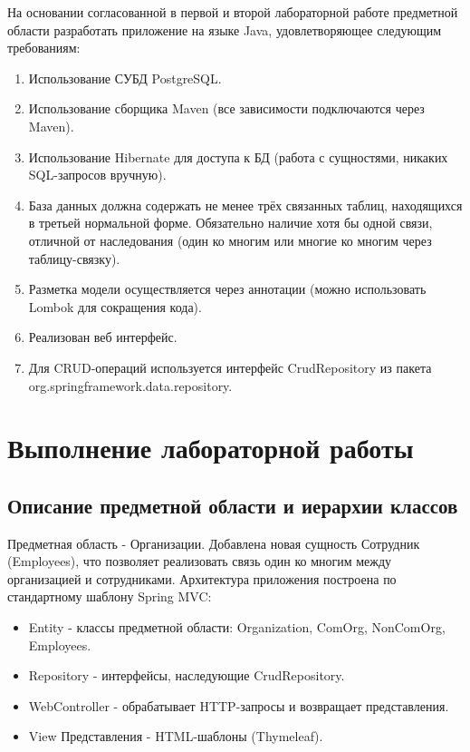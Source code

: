 \documentclass[oneside,a4paper,14pt]{extarticle}
\begin{document}
На основании согласованной в первой и второй лабораторной работе предметной области разработать приложение на языке Java, удовлетворяющее следующим требованиям:
\begin{enumerate}
    \item Использование СУБД PostgreSQL.
    \item Использование сборщика Maven (все зависимости подключаются через Maven).
    \item Использование Hibernate для доступа к БД (работа с сущностями, никаких SQL-запросов вручную).
    \item База данных должна содержать не менее трёх связанных таблиц, находящихся в третьей нормальной форме. Обязательно наличие хотя бы одной связи, отличной от наследования (один ко многим или многие ко многим через таблицу-связку).
    \item Разметка модели осуществляется через аннотации (можно использовать Lombok для сокращения кода).
    \item Реализован веб интерфейс.
    \item Для CRUD-операций используется интерфейс CrudRepository из пакета org.springframework.data.repository.
\end{enumerate}

\newpage

\section*{Выполнение лабораторной работы}

\subsection*{Описание предметной области и иерархии классов}

Предметная область - Организации. Добавлена новая сущность Сотрудник (Employees), что позволяет реализовать связь один ко многим между организацией и сотрудниками. Архитектура приложения построена по стандартному шаблону Spring MVC:

\begin{itemize}
    \item Entity - классы предметной области: Organization, ComOrg, NonComOrg, Employees.
    \item Repository - интерфейсы, наследующие CrudRepository.
    \item WebController - обрабатывает HTTP-запросы и возвращает представления.
    \item View Представления - HTML-шаблоны (Thymeleaf).
\end{itemize}
\end{document}
